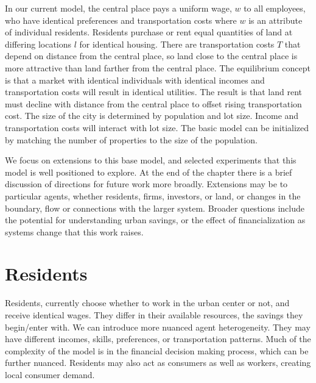 In our current model, the central place pays a uniform wage, $w$ to all employees, who have identical preferences and transportation costs where $w$ is an attribute of individual residents. Residents purchase or rent equal quantities of land at differing locations $l$ for identical housing.  There are transportation costs $T$ that depend on distance from the central place, so land close to the central place is more attractive than land farther from the central place.  The equilibrium concept is that a market with identical individuals with identical incomes and transportation costs will result in identical utilities. The result is that land rent must decline with distance from the central place to offset rising transportation cost. The size of the city is determined by population and lot size. Income and transportation costs will interact with lot size. The basic model can be initialized by matching the number of properties to the size of the population. %

We focus on extensions to this base model, and selected experiments that this model is well positioned to explore.  At the end of the chapter there is a brief discussion of directions for future work more broadly. Extensions may be to particular agents, whether residents, firms, investors, or land, or changes in the boundary, flow or connections with the larger system. Broader questions include the potential for understanding urban savings, or the effect of financialization as systems change that this work raises. %



\section{Residents}

Residents, currently choose whether to work in the urban center or not, and receive identical wages. They differ in their available resources, the savings they begin/enter with. We can introduce more nuanced agent heterogeneity. They may have different incomes, skills, preferences, or transportation patterns. Much of the complexity of the model is in the financial decision making process, which can be further nuanced. Residents may also act as consumers as well as workers, creating  local consumer demand.

